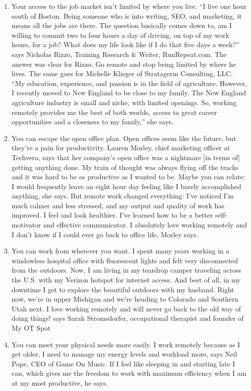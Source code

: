 \documentclass[]{book}
\begin{document}
\begin{enumerate}
\item
  Your access to the job market isn't limited by where you live. ``I live one hour south of Boston. Being someone who is into writing, SEO, and marketing, it means all the jobs are there. The question basically comes down to, am I willing to commit two to four hours a day of driving, on top of my work hours, for a job? What does my life look like if I do that five days a week?'' says Nicholas Rizzo, Training Research \& Writer, RunRepeat.com. The answer was clear for Rizzo: Go remote and stop being limited by where he lives. The same goes for Michelle Klieger of Stratagerm Consulting, LLC. ``My education, experience, and passion is in the field of agriculture. However, I recently moved to New England to be close to my family. The New England agriculture industry is small and niche, with limited openings. So, working remotely provides me the best of both worlds, access to great career opportunities and a closeness to my family,'' she says.
\item
  You can escape the open office plan. Open offices seem like the future, but they're a pain for productivity. Lauren Morley, chief marketing officer at Techvera, says that her company's open office was a nightmare {[}in terms of{]} getting anything done. My train of thought was always flying off the tracks and it was hard to be as productive as I wanted to be. Maybe you can relate: I would frequently leave an eight hour day feeling like I barely accomplished anything, she says. But remote work changed everything: I've noticed I'm much calmer and less stressed, and my output and quality of work has improved. I feel and look healthier. I've learned how to be a better self-motivator and effective communicator. I absolutely love working remotely and I don't know if I could ever go back to office life, Morley says.
\item
  You can work from wherever you want. I spent many years working in a windowless hospital office with fluorescent lights and felt very disconnected from the outdoors. Now, I am living in my teardrop camper traveling across the U.S. with my Verizon hotspot for internet access. And best of all, in my downtime I get to explore the beautiful outdoors with my husband. Right now, we're in upper Michigan and we're heading to Colorado and Southern Utah next. I love working remotely and will never go back to the old way of doing things! says Sarah Stromsdorfer, occupational therapist and founder of My OT Spot
\item
  You can meet your physical needs more easily. I work remotely because as I get older, I need to manage my energy levels and workload more, says Neil Pope, CEO of Game On Music. If I feel like sleeping in and starting late I can, which gives me the freedom to work with maximum efficiency when I am at my most productive, he says.

\end{enumerate}
\end{document}
